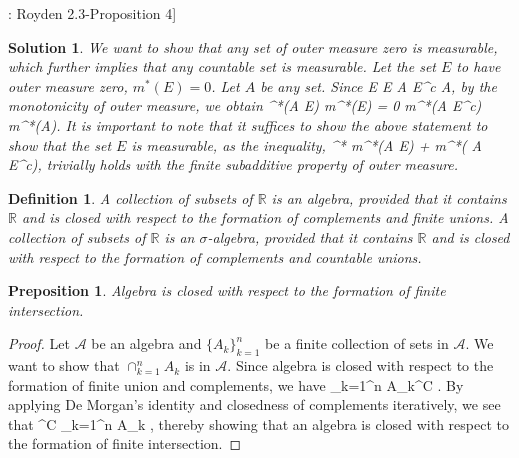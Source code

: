 \documentclass{article} %
\def\eQb#1\eQe{\begin{eqnarray*}#1\end{eqnarray*}}
\def\Qb#1\Qe{\begin{question}#1\end{question}}
\theoremstyle{quest}
\newtheorem*{definition}{Definition}
\newtheorem*{question}{Question}
\newtheorem*{preposition}{Preposition}
\newtheorem*{solution}{Solution}
\begin{document}
\bigskip

\Qb[: Royden 2.3-Proposition 4] 
\Qe
\begin{solution}
We want to show that any set of outer measure zero is measurable, which further implies that
any countable set is measurable. Let the set $E$ to have outer measure zero, $m^{*}(E) = 0$.
Let $A$ be any set. Since
\eQb
A \cap E \subseteq E \>  \> A \cap E^c \subseteq A,
\eQe
by the monotonicity of outer measure, we obtain
\eQb
m^{*}(A \cap E) \leq m^{*}(E) = 0 \>  \> m^{*}(A \cap E^c) \leq m^{*}(A).
\eQe
It is important to note that it suffices to show the above statement to show that the set $E$
is measurable, as the inequality,
\eQb
m^{*} \leq m^{*}(A \cap E) + m^{*}( A \cap E^c),
\eQe
trivially holds with the finite subadditive property of outer measure.
\end{solution}

\bigskip

\begin{definition}
A collection of subsets of $\mathbb{R}$ is an algebra, provided that it 
contains $\mathbb{R}$ and is closed with respect to the formation of complements 
and finite unions. A collection of subsets of $\mathbb{R}$ is an $\sigma$-algebra,
provided that it contains $\mathbb{R}$ and is closed with respect to the formation
of complements and countable unions.
\end{definition}

\bigskip

\begin{preposition}
Algebra is closed with respect to the formation of finite intersection.
\end{preposition}
\begin{proof}
Let $\mathcal{A}$ be an algebra and $\{ A_k \}_{k=1}^{n}$ be a finite collection of
sets in $\mathcal{A}$. We want to show that $\cap_{k=1}^{n} A_k$ is in $\mathcal{A}$.
Since algebra is closed with respect to the formation of finite union
and complements, we have 
\eQb
\cup_{k=1}^{n} A_k^{C} \>  \> . 
\eQe
By applying De Morgan's identity and closedness of complements iteratively, we see that
\eQb
{(\cap_{k=1}^{n} A_k)}^{C} \>  \>  \>\>  \>\>
\cap_{k=1}^{n} A_k \>  \> , 
\eQe
thereby showing that an algebra is closed with respect to the formation of finite intersection.
\end{proof}

\bigskip
\end{document}
